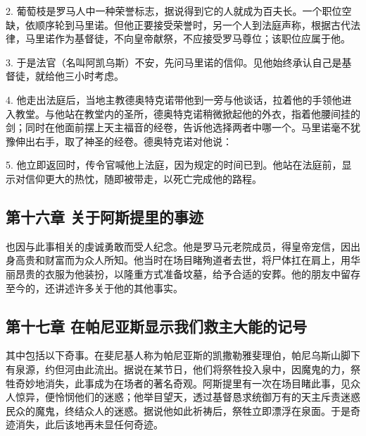 2. 葡萄枝是罗马人中一种荣誉标志，据说得到它的人就成为百夫长。一个职位空缺，依顺序轮到马里诺。但他正要接受荣誉时，另一个人到法庭声称，根据古代法律，马里诺作为基督徒，不向皇帝献祭，不应接受罗马尊位；该职位应属于他。\par

3. 于是法官（名叫阿凯乌斯）不安，先问马里诺的信仰。见他始终承认自己是基督徒，就给他三小时考虑。\par

4. 他走出法庭后，当地主教德奥特克诺带他到一旁与他谈话，拉着他的手领他进入教堂。与他站在教堂内的圣所，德奥特克诺稍微掀起他的外衣，指着他腰间挂的剑；同时在他面前摆上天主福音的经卷，告诉他选择两者中哪一个。马里诺毫不犹豫伸出右手，取了神圣的经卷。德奥特克诺对他说：\par

5. 他立即返回时，传令官喊他上法庭，因为规定的时间已到。他站在法庭前，显示对信仰更大的热忱，随即被带走，以死亡完成他的路程。\par


\subsection{第十六章 关于阿斯提里的事迹}

也因与此事相关的虔诚勇敢而受人纪念。他是罗马元老院成员，得皇帝宠信，因出身高贵和财富而为众人所知。他当时在场目睹殉道者去世，将尸体扛在肩上，用华丽昂贵的衣服为他装扮，以隆重方式准备坟墓，给予合适的安葬。他的朋友中留存至今的，还讲述许多关于他的其他事实。\par


\subsection{第十七章 在帕尼亚斯显示我们救主大能的记号}

其中包括以下奇事。在斐尼基人称为帕尼亚斯的凯撒勒雅斐理伯，帕尼乌斯山脚下有泉源，约但河由此流出。据说在某节日，他们将祭牲投入泉中，因魔鬼的力，祭牲奇妙地消失，此事成为在场者的著名奇观。阿斯提里有一次在场目睹此事，见众人惊异，便怜悯他们的迷惑；他举目望天，透过基督恳求统御万有的天主斥责迷惑民众的魔鬼，终结众人的迷惑。据说他如此祈祷后，祭牲立即漂浮在泉面。于是奇迹消失，此后该地再未显任何奇迹。\par

